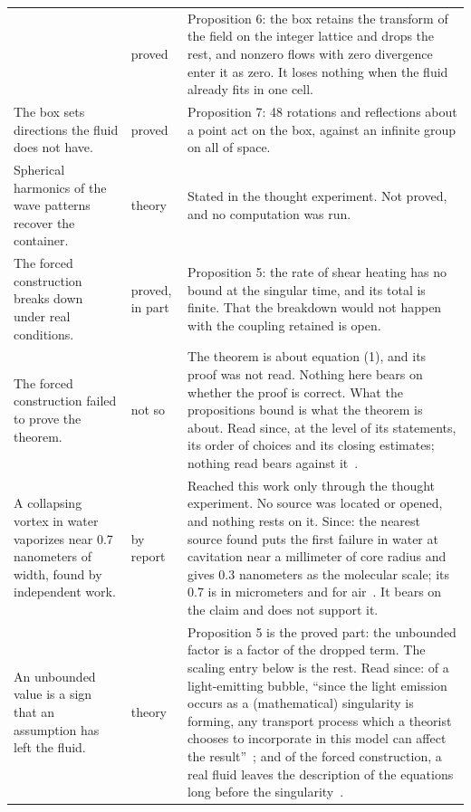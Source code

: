 \begin{longtable}{@{}>{\raggedright\arraybackslash}p{}>{\raggedright\arraybackslash}p{}>{\raggedright\arraybackslash}p{}@{}}
& proved
& Proposition 6: the box retains the transform of the field on the integer lattice and drops the
rest, and nonzero flows with zero divergence enter it as zero. It loses nothing when the fluid
already fits in one cell. \\[0.6em]
The box sets directions the fluid does not have.
& proved
& Proposition 7: 48 rotations and reflections about a point act on the box, against an infinite
group on all of space. \\[0.6em]
Spherical harmonics of the wave patterns recover the container.
& theory
& Stated in the thought experiment. Not proved, and no computation was run. \\[0.6em]
The forced construction breaks down under real conditions.
& proved, in part
& Proposition 5: the rate of shear heating has no bound at the singular time, and its total is
finite. That the breakdown would not happen with the coupling retained is open. \\[0.6em]
The forced construction failed to prove the theorem.
& not so
& The theorem is about equation (1), and its proof was not read. Nothing here bears on whether
the proof is correct. What the propositions bound is what the theorem is about. Read since, at the
level of its statements, its order of choices and its closing estimates; nothing read bears
against it~\cite{src:OpenAI-2026-Navier-Stokes}. \\[0.6em]
A collapsing vortex in water vaporizes near 0.7 nanometers of width, found by independent work.
& by report
& Reached this work only through the thought experiment. No source was located or opened, and
nothing rests on it. Since: the nearest source found puts the first failure in water at
cavitation near a millimeter of core radius and gives 0.3 nanometers as the molecular scale; its
0.7 is in micrometers and for air~\cite{src:Duraiswami-2026}. It bears on the claim and does not
support it. \\[0.6em]
An unbounded value is a sign that an assumption has left the fluid.
& theory
& Proposition 5 is the proved part: the unbounded factor is a factor of the dropped term. The
scaling entry below is the rest. Read since: of a light-emitting bubble, ``since the light emission
occurs as a (mathematical) singularity is forming, any transport process which a theorist chooses
to incorporate in this model can affect the result''~\cite{src:Barber-1997}; and of the forced
construction, a real fluid leaves the description of the equations long before the
singularity~\cite{src:Duraiswami-2026}. \\
\end{longtable}

